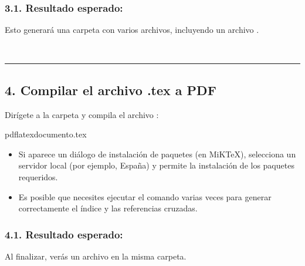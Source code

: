\documentclass[a4paper,10pt,spanish]{sphinxmanual}
\begin{document}
\subsubsection{3.1. Resultado esperado:}
\label{\detokenize{configuracion_inicial/009.Generar_PDF:resultado-esperado}}
\sphinxAtStartPar
Esto generará una carpeta  con varios archivos, incluyendo un archivo .

\sphinxAtStartPar
📸 

\sphinxAtStartPar
{}


\bigskip\hrule\bigskip



\subsection{4. Compilar el archivo .tex a PDF}
\label{\detokenize{configuracion_inicial/009.Generar_PDF:compilar-el-archivo-tex-a-pdf}}
\sphinxAtStartPar
Dirígete a la carpeta  y compila el archivo :

\begin{sphinxVerbatim}[commandchars=\\\{\}]
pdflatexdocumento.tex
\end{sphinxVerbatim}
\begin{itemize}
\item {} 
\sphinxAtStartPar
Si aparece un diálogo de instalación de paquetes (en MiKTeX), selecciona un servidor local (por ejemplo, España) y permite la instalación de los paquetes requeridos.

\item {} 
\sphinxAtStartPar
Es posible que necesites ejecutar el comando varias veces para generar correctamente el índice y las referencias cruzadas.

\end{itemize}


\subsubsection{4.1. Resultado esperado:}
\label{\detokenize{configuracion_inicial/009.Generar_PDF:id1}}
\sphinxAtStartPar
Al finalizar, verás un archivo  en la misma carpeta.

\sphinxAtStartPar
{}
\end{document}
